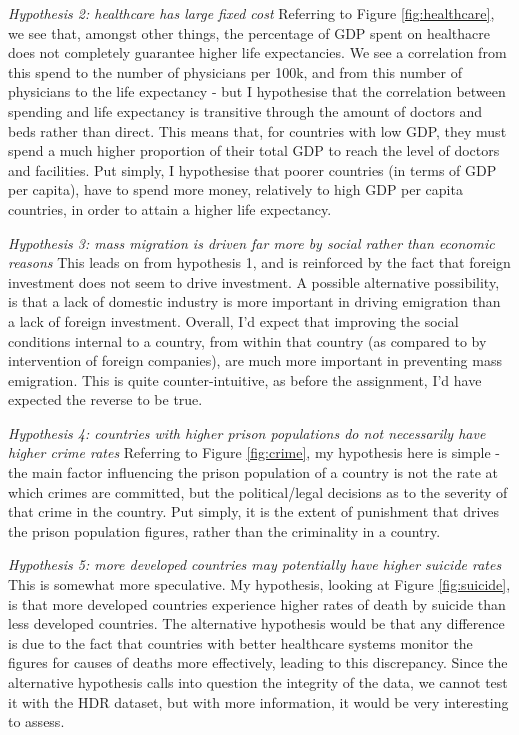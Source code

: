 \documentclass[ 10pt ]{fphw}
\begin{document}
\textit{Hypothesis 2: healthcare has large fixed cost}
Referring to Figure \ref{fig:healthcare}, we see that, amongst other things, the percentage of GDP spent on healthacre does not completely guarantee higher life expectancies. We see a correlation from this spend to the number of physicians per 100k, and from this number of physicians to the life expectancy - but I hypothesise that the correlation between spending and life expectancy is transitive through the amount of doctors and beds rather than direct. This means that, for countries with low GDP, they must spend a much higher proportion of their total GDP to reach the level of doctors and facilities. Put simply, I hypothesise that poorer countries (in terms of GDP per capita), have to spend more money, relatively to high GDP per capita countries, in order to attain a higher life expectancy.

\textit{Hypothesis 3: mass migration is driven far more by social rather than economic reasons}
This leads on from hypothesis 1, and is reinforced by the fact that foreign investment does not seem to drive investment. A possible alternative possibility, is that a lack of domestic industry is more important in driving emigration than a lack of foreign investment. Overall, I'd expect that improving the social conditions internal to a country, from within that country (as compared to by intervention of foreign companies), are much more important in preventing mass emigration.  This is quite counter-intuitive, as before the assignment, I'd have expected the reverse to be true.

\textit{Hypothesis 4: countries with higher prison populations do not necessarily have higher crime rates}
Referring to Figure \ref{fig:crime}, my hypothesis here is simple - the main factor influencing the prison population of a country is not the rate at which crimes are committed, but the political/legal decisions as to the severity of that crime in the country. Put simply, it is the extent of punishment that drives the prison population figures, rather than the criminality in a country. 

\textit{Hypothesis 5: more developed countries may potentially have higher suicide rates}
This is somewhat more speculative. My hypothesis, looking at Figure \ref{fig:suicide}, is that more developed countries experience higher rates of death by suicide than less developed countries. The alternative hypothesis would be that any difference is due to the fact that countries with better healthcare systems monitor the figures for causes of deaths more effectively, leading to this discrepancy. Since the alternative hypothesis calls into question the integrity of the data, we cannot test it with the HDR dataset, but with more information, it would be very interesting to assess.
\end{document}
